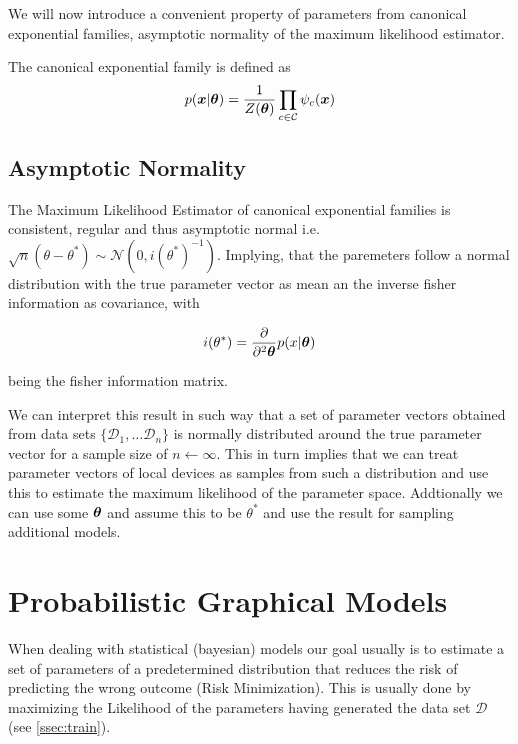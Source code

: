 We will now introduce a convenient property of parameters from canonical exponential families, asymptotic normality of the maximum likelihood estimator. 

The canonical exponential family is defined as 
\begin{equation}
    p(\boldsymbol{x} \lvert \boldsymbol{\theta}) = \frac{1}{Z(\boldsymbol{\theta})} \prod_{c \in \mathcal{C}} \psi_c(\boldsymbol{x})
\end{equation}

\subsection{Asymptotic Normality}
\label{ssec:asymp}
The Maximum Likelihood Estimator of canonical exponential families is consistent, regular and thus asymptotic normal i.e. $\sqrt{n}(\theta - \theta^*) \sim \mathcal{N}(0, i(\theta^*)^{-1})$.
Implying, that the paremeters follow a normal distribution with the  true parameter vector as mean an the inverse fisher information as covariance, with 

\begin{equation}
    i(\theta^*) = \frac{\partial}{\partial^2 \boldsymbol{\theta}} p(x \lvert \boldsymbol{\theta})
\end{equation}

being the fisher information matrix.

We can interpret this result in such way that a set of parameter vectors obtained from data sets $\{\mathcal{D}_1, \ldots \mathcal{D}_n\}$ is normally distributed around the true parameter vector for a sample size of $n \leftarrow \infty$. 
This in turn implies that we can treat parameter vectors of local devices as samples from such a distribution and use this to estimate the maximum likelihood of the parameter space.
Addtionally we can use some $\boldsymbol{\theta}$ and assume this to be $\theta^*$ and use the result for sampling additional models.


\section{Probabilistic Graphical Models}
\label{sec:pgm}
When dealing with statistical (bayesian) models our goal usually is to estimate a set of parameters of a predetermined distribution that reduces the risk of predicting the wrong outcome (Risk Minimization). 
This is usually done by maximizing the Likelihood of the parameters having generated the data set $\mathcal{D}$ (see \ref{ssec:train}).

